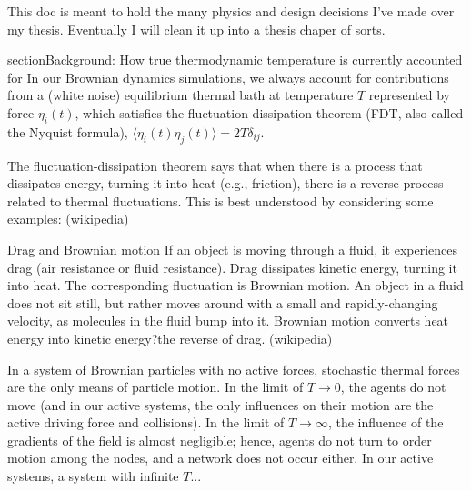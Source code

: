 This doc is meant to hold the many physics and design decisions I've made over my thesis. Eventually I will clean it up into a thesis chaper of sorts.

section{Background: How true thermodynamic temperature is currently accounted for}
In our Brownian dynamics simulations, we always account for contributions from a (white noise) equilibrium thermal bath at temperature $T$ represented by force $\eta_i(t)$, which satisfies the fluctuation-dissipation theorem (FDT, also called the Nyquist formula), $\langle\eta_i(t)\eta_j(t)\rangle=2T\delta_{ij}$.

The fluctuation-dissipation theorem says that when there is a process that dissipates energy, turning it into heat (e.g., friction), there is a reverse process related to thermal fluctuations. This is best understood by considering some examples: (wikipedia)

Drag and Brownian motion
If an object is moving through a fluid, it experiences drag (air resistance or fluid resistance). Drag dissipates kinetic energy, turning it into heat. The corresponding fluctuation is Brownian motion. An object in a fluid does not sit still, but rather moves around with a small and rapidly-changing velocity, as molecules in the fluid bump into it. Brownian motion converts heat energy into kinetic energy?the reverse of drag. (wikipedia)

In a system of Brownian particles with no active forces, stochastic thermal forces are the only means of particle motion. In the limit of $T\rightarrow0$, the agents do not move (and in our active systems, the only influences on their motion are the active driving force and collisions). In the limit of $T\rightarrow\infty$, the influence of the gradients of the field is almost negligible; hence, agents do not turn to order motion among the nodes, and a network does not occur either. In our active systems, a system with infinite $T$... \cite{Schweitzer_2003}

